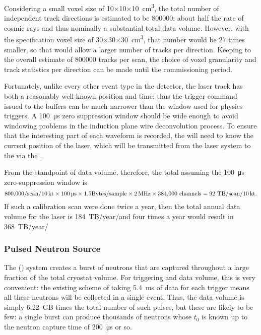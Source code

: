 Considering a small voxel size of  \num{10}$\times$\num{10}$\times$\SI{10}{\cubic\cm}, the total number of independent track directions is estimated to be \num{800000}: about half the rate of cosmic rays and thus nominally a substantial total data volume. 
However, with the specification voxel size of \num{30}$\times$\num{30}$\times$\SI{30}{\cubic\cm}, that number would be \num{27} times smaller, so that would allow a larger number of tracks per direction. Keeping to the overall estimate of \num{800000} tracks per scan, the choice of voxel granularity and track statistics per direction can be made until the commissioning period.

Fortunately, unlike every other event type in the detector, the laser track has both a reasonably well known position and time; thus the trigger command issued to the  buffers can be much narrower than the window used for physics triggers. A \SI{100}{\micro\s} zero suppression window should be wide enough to avoid windowing problems in the induction plane wire deconvolution process.
To ensure that the interesting part of each waveform is recorded, the  will need to know the current position  of the laser, which will be transmitted from the laser system to the  via the .

From the standpoint of data volume, therefore, the total assuming the \SI{100}{\micro\s} zero-suppression window is
\begin{equation}
\num{800000}/{\rm scan}/\nominalmodsize \times \SI{100}{\micro\s} \times \num{1.5}{\rm Bytes/sample}\times \SI{2}{\mega\hertz}\times \num{384000}~{\rm channels}   = \num{92}~{\rm TB/scan/\nominalmodsize.}   
\end{equation}
If such a calibration scan were done twice a year, then the total annual data volume for the laser is \num{184}~TB/year/\nominalmodsize and four times a year would result in \num{368}~TB/year/\nominalmodsize

\subsubsection{Pulsed Neutron Source}

The  () system creates a burst of neutrons that
are captured throughout a large fraction of the total cryostat volume. For triggering and data volume, this is very convenient: the existing scheme of taking \SI{5.4}{\milli\s} of data for each trigger means all these neutrons will be collected in a single  event. Thus, the data volume is simply \num{6.22}~GB times the total number of such pulses, but these are likely to be few: a single burst can produce thousands of neutrons whose $t_0$ is known up to the neutron capture time of \SI{200}{\micro\s} or so.

